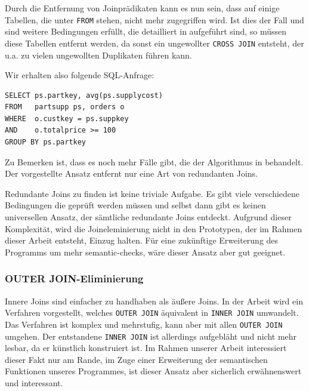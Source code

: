 Durch die Entfernung von Joinprädikaten kann es nun sein, dass auf einige Tabellen, die unter \verb|FROM| stehen, nicht mehr zugegriffen wird. Ist dies der Fall und sind weitere Bedingungen erfüllt, die detailliert in \cite{joinelem2} aufgeführt sind, so müssen diese Tabellen entfernt werden, da sonst ein ungewollter \verb|CROSS JOIN| entsteht, der u.a. zu vielen ungewollten Duplikaten führen kann.

Wir erhalten also folgende SQL-Anfrage:

\begin{lstlisting}[mathescape]
SELECT ps.partkey, avg(ps.supplycost)
FROM   partsupp ps, orders o
WHERE  o.custkey = ps.suppkey 
AND    o.totalprice >= 100
GROUP BY ps.partkey
\end{lstlisting}

Zu Bemerken ist, dass es noch mehr Fälle gibt, die der Algorithmus in \cite{joinelem2} behandelt. Der vorgestellte Ansatz entfernt nur eine Art von redundanten Joins. 

Redundante Joins zu finden ist keine triviale Aufgabe. Es gibt viele verschiedene Bedingungen die geprüft werden müssen und selbst dann gibt es keinen universellen Ansatz, der sämtliche redundante Joins entdeckt. Aufgrund dieser Komplexität, wird die Joineleminierung nicht in den Prototypen, der im Rahmen dieser Arbeit entsteht, Einzug halten. Für eine zukünftige Erweiterung des Programms um mehr semantic-checks, wäre dieser Ansatz aber gut geeignet.


\subsubsection*{OUTER JOIN-Eliminierung}

Innere Joins sind einfacher zu handhaben als äußere Joins. In der Arbeit \cite{outer2inner} wird ein Verfahren vorgestellt, welches \verb|OUTER JOIN| äquivalent in \verb|INNER JOIN| umwandelt. Das Verfahren ist komplex und mehrstufig, kann aber mit allen \verb|OUTER JOIN| umgehen. Der entstandene \verb|INNER JOIN| ist allerdings aufgebläht und nicht mehr lesbar, da er künstlich konstruiert ist. Im Rahmen unserer Arbeit interessiert dieser Fakt nur am Rande, im Zuge einer Erweiterung der semantischen Funktionen unseres Programmes, ist dieser Ansatz aber sicherlich erwähnenswert und interessant.


